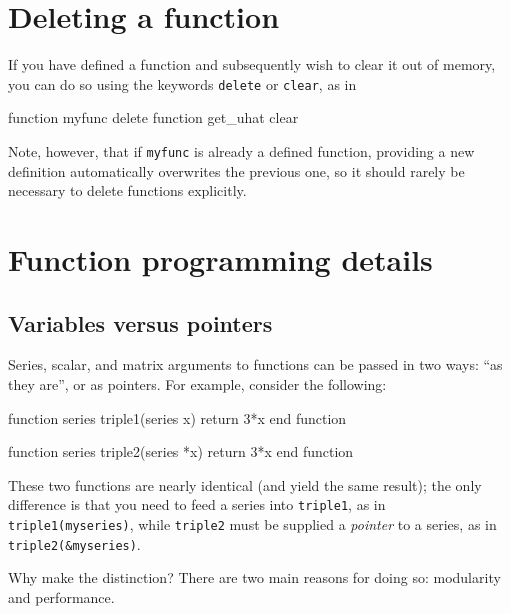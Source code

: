 \section{Deleting a function}
\label{func-del}

If you have defined a function and subsequently wish to clear it out
of memory, you can do so using the keywords \texttt{delete} or
\texttt{clear}, as in

\begin{code}
function myfunc delete
function get_uhat clear
\end{code}

Note, however, that if \texttt{myfunc} is already a defined function,
providing a new definition automatically overwrites the previous one,
so it should rarely be necessary to delete functions explicitly.

\section{Function programming details}
\label{func-details}

\subsection{Variables versus pointers}
\label{funscope}

Series, scalar, and matrix arguments to functions can be passed in two
ways: ``as they are'', or as pointers. For example, consider the
following:
\begin{code}
function series triple1(series x)
  return 3*x
end function
  
function series triple2(series *x)
  return 3*x
end function
\end{code}

These two functions are nearly identical (and yield the same result);
the only difference is that you need to feed a series into
\texttt{triple1}, as in \texttt{triple1(myseries)}, while
\texttt{triple2} must be supplied a \emph{pointer} to a series, as in
\texttt{triple2(\&myseries)}. 

Why make the distinction? There are two main reasons for doing so:
modularity and performance.


